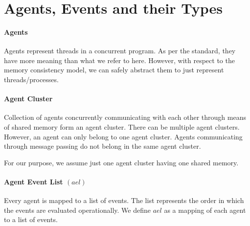 \section{Agents, Events and their Types}

    \paragraph{Agents}
       Agents represent threads in a concurrent program. As per the standard, they have more meaning than what we refer to here. However, with respect to the memory consistency model, we can safely abstract them to just represent threads/processes.

    \paragraph{Agent Cluster}
        Collection of agents concurrently communicating with each other through means of shared memory form an agent cluster.  There can be multiple agent clusters. However, an agent can only belong to one agent cluster. Agents communicating through message passing do not belong in the same agent cluster. 

        For our purpose, we assume just one agent cluster having one shared memory. 

    \paragraph{Agent Event List $(ael)$}
        Every agent is mapped to a list of events. The list represents the order in which the events are evaluated operationally\footnotemark. We define $ael$ as a mapping of each agent to a list of events.
        

        

            


